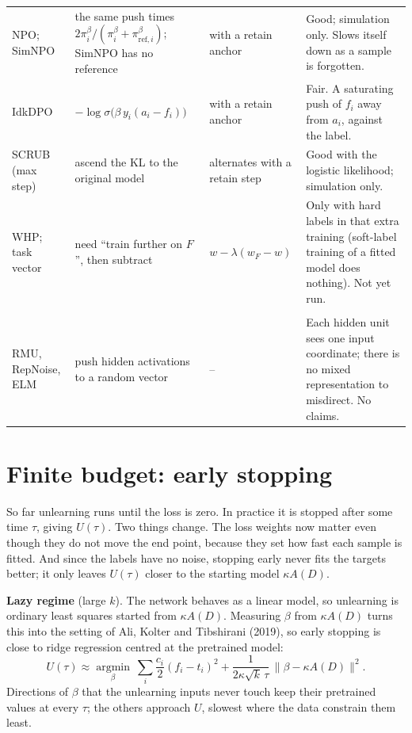 \documentclass[10pt]{article}
\begin{document}
\begin{landscape}
{\begin{longtable}{@{}>{\raggedright\arraybackslash}p{4.3cm}>{\raggedright\arraybackslash}p{7.2cm}>{\raggedright\arraybackslash}p{5.2cm}>{\raggedright\arraybackslash}p{7.6cm}@{}}
NPO; SimNPO & the same push times $2\pi_i^\beta/(\pi_i^\beta+\pi_{\mathrm{ref},i}^\beta)$; SimNPO has no reference & with a retain anchor & Good; simulation only. Slows itself down as a sample is forgotten.\\
IdkDPO & $-\log\sigma\big(\beta\,y_i(a_i-f_i)\big)$ & with a retain anchor & Fair. A saturating push of $f_i$ away from $a_i$, against the label.\\
SCRUB (max step) & ascend the KL to the original model & alternates with a retain step & Good with the logistic likelihood; simulation only.\\
WHP; task vector & need ``train further on $F$'', then subtract & $w-\lambda(w_F-w)$ & Only with hard labels in that extra training (soft-label training of a fitted model does nothing). Not yet run.\\
\midrule
\multicolumn{4}{@{}l}{\emph{Not representable}}\\
RMU, RepNoise, ELM & push hidden activations to a random vector & -- & Each hidden unit sees one input coordinate; there is no mixed representation to misdirect. No claims.\\
\bottomrule
\end{longtable}}
\end{landscape}\restoregeometry

\section{Finite budget: early stopping}\label{sec:budget}
So far unlearning runs until the loss is zero. In practice it is stopped after some time $\tau$, giving $U(\tau)$. Two things change. The loss weights now matter even though they do not move the end point, because they set how fast each sample is fitted. And since the labels have no noise, stopping early never fits the targets better; it only leaves $U(\tau)$ closer to the starting model $\kappa A(D)$.

\textbf{Lazy regime} (large $k$). The network behaves as a linear model, so unlearning is ordinary least squares started from $\kappa A(D)$. Measuring $\beta$ from $\kappa A(D)$ turns this into the setting of Ali, Kolter and Tibshirani (2019), so early stopping is close to ridge regression centred at the pretrained model:
\[
U(\tau)\approx\operatorname*{argmin}_\beta\ \sum_i\frac{c_i}{2}(f_i-t_i)^2+\frac{1}{2\kappa\sqrt k\,\tau}\,\big\|\beta-\kappa A(D)\big\|^2 .
\]
Directions of $\beta$ that the unlearning inputs never touch keep their pretrained values at every $\tau$; the others approach $U$, slowest where the data constrain them least.
\end{document}
